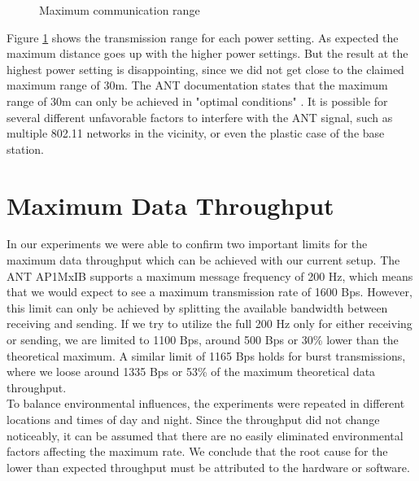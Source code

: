 \begin{description}
\begin{figure}[H]
		\caption{Maximum communication range}\label{fig:exp6}
	\end{figure}
	Figure \ref{fig:exp6} shows the transmission range for each power setting. As expected the maximum distance goes up with the higher power settings. But the result at the highest power setting is disappointing, since we did not get close to the claimed maximum range of 30m. The ANT documentation states that the maximum range of 30m can only be achieved in "optimal conditions" \cite{DynastreamInnovationsInc.2013}. It is possible for several different unfavorable factors to interfere with the ANT signal, such as multiple 802.11 networks in the vicinity, or even the plastic case of the base station. 
\end{description}

\newpage
\section{Maximum Data Throughput}
\label{sec:dataThrougput}

In our experiments we were able to confirm two important limits for the maximum data throughput which can be achieved with our current setup. The ANT AP1MxIB supports a maximum message frequency of 200 Hz, which means that we would expect to see a maximum transmission rate of 1600 Bps.
However, this limit can only be achieved by splitting the available bandwidth between receiving and sending. If we try to utilize the full 200 Hz only for either receiving or sending, we are limited to 1100 Bps, around 500 Bps or 30\% lower than the theoretical maximum. A similar limit of 1165 Bps holds for burst transmissions, where we loose around 1335 Bps or 53\% of the maximum theoretical data throughput.\\

To balance environmental influences, the experiments were repeated in different locations and times of day and night. Since the throughput did not change noticeably, it can be assumed that there are no easily eliminated environmental factors affecting the maximum rate. We conclude that the root cause for the lower than expected throughput must be attributed to the hardware or software. \\

